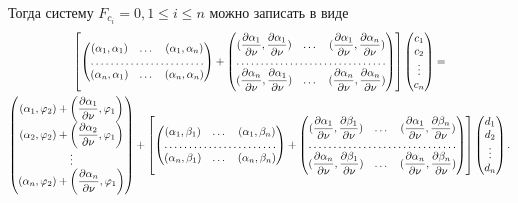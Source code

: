 \documentclass[a4paper, 12pt]{article}
\begin{document}
Тогда систему $F_{c_i}=0,1\leq i \leq n$ можно записать в виде
\begin{multline}
  \left[
    \begin{pmatrix}
      (\alpha_1,\alpha_1) & \dots & (\alpha_1,\alpha_n) \\
      \hdotsfor{3} \\
      (\alpha_n,\alpha_1) & \dots & (\alpha_n,\alpha_n)
      \end{pmatrix}+
      \begin{pmatrix}
      (\dfrac{\partial\alpha_1}{\partial \nu},\dfrac{\partial\alpha_1}{\partial \nu}) & \dots & (\dfrac{\partial\alpha_1}{\partial \nu},\dfrac{\partial\alpha_n}{\partial \nu}) \\
      \hdotsfor{3} \\
      (\dfrac{\partial\alpha_n}{\partial \nu},\dfrac{\partial\alpha_1}{\partial \nu}) & \dots & (\dfrac{\partial\alpha_n}{\partial \nu},\dfrac{\partial\alpha_n}{\partial \nu})
      \end{pmatrix}
  \right]
\begin{pmatrix}
  c_1\\
  c_2\\
  \vdots\\
  c_n
\end{pmatrix}=\\
\begin{pmatrix}
  (\alpha_1,\varphi_2)+\left(\dfrac{\partial \alpha_1}{\partial \nu},\varphi_1\right)\\
  (\alpha_2,\varphi_2)+\left(\dfrac{\partial \alpha_2}{\partial \nu},\varphi_1\right)\\
  \vdots\\
  (\alpha_n,\varphi_2)+\left(\dfrac{\partial \alpha_n}{\partial \nu},\varphi_1\right)
\end{pmatrix}+
\left[
  \begin{pmatrix}
    (\alpha_1,\beta_1) & \dots & (\alpha_1,\beta_n) \\
    \hdotsfor{3} \\
    (\alpha_n,\beta_1) & \dots & (\alpha_n,\beta_n)
    \end{pmatrix}+
    \begin{pmatrix}
    (\dfrac{\partial\alpha_1}{\partial \nu},\dfrac{\partial\beta_1}{\partial \nu}) & \dots & (\dfrac{\partial\alpha_1}{\partial \nu},\dfrac{\partial\beta_n}{\partial \nu}) \\
    \hdotsfor{3} \\
    (\dfrac{\partial\alpha_n}{\partial \nu},\dfrac{\partial\beta_1}{\partial \nu}) & \dots & (\dfrac{\partial\alpha_n}{\partial \nu},\dfrac{\partial\beta_n}{\partial \nu})
    \end{pmatrix}
\right]
\begin{pmatrix}
  d_1\\
  d_2\\
  \vdots\\
  d_n
\end{pmatrix}.
\end{multline}
\end{document}
